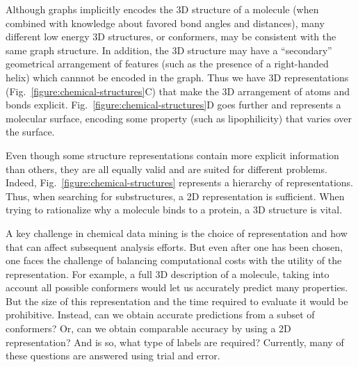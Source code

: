 \documentclass{sig-alternate}
\begin{document}
Although graphs implicitly encodes the 3D structure of a molecule
(when combined with knowledge about favored bond angles and
distances), many different low energy 3D structures, or conformers,
may be consistent with the same graph structure. In addition, the 3D
structure may have a ``secondary'' geometrical arrangement of features
(such as the presence of a right-handed helix) which cannnot be
encoded in the graph. Thus we have 3D representations
(Fig.~\ref{figure:chemical-structures}C) that make the 3D arrangement
of atoms and bonds explicit. Fig.~\ref{figure:chemical-structures}D
goes further and represents a molecular surface, encoding some
property (such as lipophilicity) that varies over the surface.

Even though some structure representations contain more explicit
information than others, they are all equally valid and are suited for
different problems. Indeed, Fig.~\ref{figure:chemical-structures}
represents a hierarchy of representations. Thus, when searching for
substructures, a 2D representation is sufficient. When trying to
rationalize why a molecule binds to a protein, a 3D structure is
vital.

A key challenge in chemical data mining is the choice of
representation and how that can affect subsequent analysis
efforts. But even after one has been chosen, one faces the challenge
of balancing computational costs with the utility of the
representation. For example, a full 3D description of a molecule,
taking into account all possible conformers would let us accurately
predict many properties. But the size of this representation and the
time required to evaluate it would be prohibitive. Instead, can we
obtain accurate predictions from a subset of conformers? Or, can we
obtain comparable accuracy by using a 2D representation? And is so,
what type of labels are required? Currently, many of these questions
are answered using trial and error.
\end{document}
